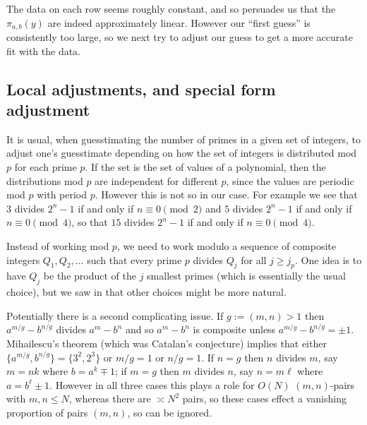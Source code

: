 \documentclass[12pt, a4paper,  reqno, english]{amsart}%
\numberwithin{equation}{section}
\theoremstyle{definition}
\renewcommand{\leq}{\leqslant}
\renewcommand{\geq}{\geqslant}
\begin{document}
    
\noindent The data on each row seems roughly constant, and so persuades us that the $\pi_{a,b}(y)$ are indeed approximately linear.
However our ``first guess'' is consistently too large, so
we next try to adjust our guess to get a more accurate fit with the data.


\subsection{Local adjustments, and special form adjustment}
It is usual, when  guesstimating the number of primes in a given set of integers, to adjust one's guesstimate depending on how the set of integers is distributed mod $p$ for each prime $p$. If the set is the set of values of a polynomial, then the distributions mod $p$ are independent for different $p$, since the values are periodic mod $p$ with period $p$.
However this is not so in our case. For example we see that $3$ divides $2^n-1$ if and only if $n\equiv 0 \pmod 2$ and 
$5$ divides $2^n-1$ if and only if $n\equiv 0 \pmod 4$, so that $15$ divides $2^n-1$ if and only if $n\equiv 0 \pmod 4$. 

Instead of working mod $p$, we need to work modulo a sequence of composite integers $Q_1,Q_2,\dots$ such that every prime $p$ divides  $Q_j$ for all $j\geq j_p$.  One idea is to have  $Q_j$ be the product of the $j$ smallest primes (which is essentially the usual choice), but  we saw in \cite{GG} that other choices might be more natural.

Potentially there is a second complicating issue. If $g:=(m,n)>1$ then $a^{m/g}-b^{n/g}$ divides $a^m-b^n$ and so $a^m-b^n$ is composite unless
$a^{m/g}-b^{n/g}=\pm 1$. Mihailescu's theorem \cite{Mi} (which was Catalan's conjecture) implies that either
$\{ a^{m/g}, b^{n/g}\}=\{ 3^2,2^3\}$ or $m/g=1$ or $n/g=1$.
If $n=g$ then $n$ divides $m$, say $m=nk$ where $b=a^k\mp 1$;
if $m=g$ then $m$ divides $n$, say $n=m\ell$ where $a=b^\ell\pm 1$.
However in all three cases this plays a role for $O(N)$  $(m,n)$-pairs with $m,n\leq N$, whereas there are $\asymp N^2$ pairs, so these cases effect a vanishing proportion of pairs $(m,n)$, so can be ignored.
\end{document}
